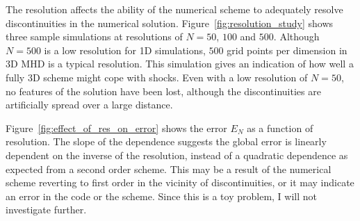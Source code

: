 The resolution affects the ability of the numerical scheme to adequately resolve discontinuities in the numerical solution. Figure~\ref{fig:resolution_study} shows three sample simulations at resolutions of $N=50$, $100$ and $500$. Although $N=500$ is a low resolution for 1D simulations, $500$ grid points per dimension in 3D MHD is a typical resolution. This simulation gives an indication of how well a fully 3D scheme might cope with shocks. Even with a low resolution of $N=50$, no features of the solution have been lost, although the discontinuities are artificially spread over a large distance.

Figure~\ref{fig:effect_of_res_on_error} shows the error $E_N$ as a function of resolution. The slope of the dependence suggests the global error is linearly dependent on the inverse of the resolution, instead of a quadratic dependence as expected from a second order scheme. This may be a result of the numerical scheme reverting to first order in the vicinity of discontinuities, or it may indicate an error in the code or the scheme. Since this is a toy problem, I will not investigate further.

